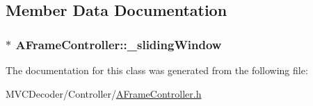 \subsection{Member Data Documentation}
\hypertarget{class_a_frame_controller_aca7790494d5c5d114171269ddaabd568}{
\subsubsection[{\_\-slidingWindow}]{$\ast$ {\bf AFrameController::\_\-slidingWindow}}}
\label{class_a_frame_controller_aca7790494d5c5d114171269ddaabd568}


The documentation for this class was generated from the following file:\begin{DoxyCompactItemize}
\item 
MVCDecoder/Controller/\hyperlink{_a_frame_controller_8h}{AFrameController.h}\end{DoxyCompactItemize}
